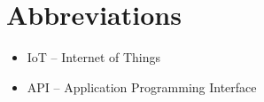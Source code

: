 \chapter*{Abbreviations}
\begin{itemize}
    \item IoT – Internet of Things
    \item API – Application Programming Interface
\end{itemize}
